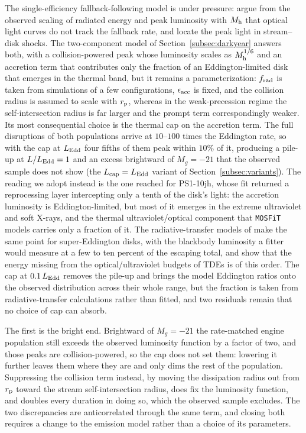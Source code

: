 \documentclass[twocolumn,pdftex]{aastex701}
\newcommand{\mosfit}{{\tt MOSFiT}\xspace}
\begin{document}
The single-efficiency fallback-following model is under pressure: \citet{Mummery:2025b} argue from the observed scaling of radiated energy and peak luminosity with $M_{\rm h}$ that optical light curves do not track the fallback rate, and \citet{Steinberg:2024a} locate the peak light in stream--disk shocks. The two-component model of Section~\ref{subsec:darkyear} answers both, with a collision-powered peak whose luminosity scales as $M_{\rm h}^{1/6}$ and an accretion term that contributes only the fraction of an Eddington-limited disk that emerges in the thermal band, but it remains a parameterization: $f_{\rm rad}$ is taken from simulations of a few configurations, $\epsilon_{\rm acc}$ is fixed, and the collision radius is assumed to scale with $r_{\rm p}$, whereas in the weak-precession regime the self-intersection radius is far larger and the prompt term correspondingly weaker. Its most consequential choice is the thermal cap on the accretion term. The full disruptions of both populations arrive at $10$--$100$ times the Eddington rate, so with the cap at $L_{\rm Edd}$ four fifths of them peak within $10\%$ of it, producing a pile-up at $L/L_{\rm Edd} = 1$ and an excess brightward of $M_g = -21$ that the observed sample does not show (the $L_{\rm cap} = L_{\rm Edd}$ variant of Section~\ref{subsec:variants}). The reading we adopt instead is the one \citet{Guillochon:2014a} reached for PS1-10jh, whose fit returned a reprocessing layer intercepting only a tenth of the disk's light: the accretion luminosity is Eddington-limited, but most of it emerges in the extreme ultraviolet and soft X-rays, and the thermal ultraviolet/optical component that \mosfit models carries only a fraction of it. The radiative-transfer models of \citet{Thomsen:2022a} make the same point for super-Eddington disks, with the blackbody luminosity a fitter would measure at a few to ten percent of the escaping total, and \citet{Lu:2018a} show that the energy missing from the optical/ultraviolet budgets of TDEs is of this order. The cap at $0.1\, L_{\rm Edd}$ removes the pile-up and brings the model Eddington ratios onto the observed distribution across their whole range, but the fraction is taken from radiative-transfer calculations rather than fitted, and two residuals remain that no choice of cap can absorb.

The first is the bright end. Brightward of $M_g = -21$ the rate-matched engine population still exceeds the observed luminosity function by a factor of two, and those peaks are collision-powered, so the cap does not set them: lowering it further leaves them where they are and only dims the rest of the population. Suppressing the collision term instead, by moving the dissipation radius out from $r_{\rm p}$ toward the stream self-intersection radius, does fix the luminosity function, and doubles every duration in doing so, which the observed sample excludes. The two discrepancies are anticorrelated through the same term, and closing both requires a change to the emission model rather than a choice of its parameters.
\end{document}
